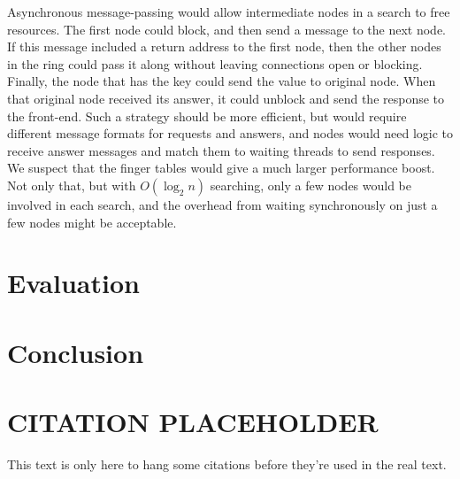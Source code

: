 \documentclass[11pt,conference]{IEEEtran}
\begin{document}
Asynchronous message-passing would allow intermediate nodes in a search to free
resources. The first node could block, and then send a message to the next node.
If this message included a return address to the first node, then the other
nodes in the ring could pass it along without leaving connections open or
blocking. Finally, the node that has the key could send the value to original
node. When that original node received its answer, it could unblock and send the
response to the front-end. Such a strategy should be more efficient, but would
require different message formats for requests and answers, and nodes would need
logic to receive answer messages and match them to waiting threads to send
responses. We suspect that the finger tables would give a much larger
performance boost. Not only that, but with $O(\log_2 n)$ searching, only a few
nodes would be involved in each search, and the overhead from waiting
synchronously on just a few nodes might be acceptable.


\section{Evaluation}



\section{Conclusion}



\section{CITATION PLACEHOLDER}

This text is only here to hang some citations before they're used in the real
text.
\cite{linuxjournal_dht}
\cite{chord}
\cite{parallel}
\cite{Balakrishnan:2003:LUD:606272.606299}




\end{document}

